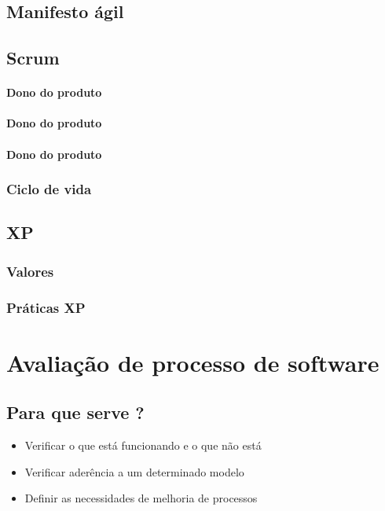 \documentclass{article}
\begin{document}
\subsection{Manifesto ágil}

\subsection{Scrum}
\paragraph{Dono do produto}
\paragraph{Dono do produto}
\paragraph{Dono do produto}

\subsubsection{Ciclo de vida}

\subsection{XP}
\subsubsection{Valores}
\subsubsection{Práticas XP}

\section{Avaliação de processo de software} \date{23 de Abril de 2014}

\subsection{Para que serve ?}
	\begin{itemize}
	\item Verificar o que está funcionando e o que não está
	\item Verificar aderência a um determinado modelo
	\item Definir as necessidades de melhoria de processos	
	\end{itemize}	
\end{document}
